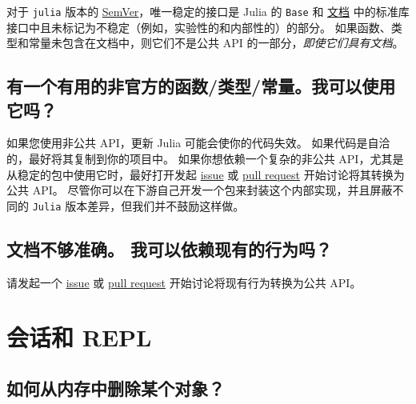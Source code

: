 对于 \texttt{julia} 版本的 \href{https://semver.org/}{SemVer}，唯一稳定的接口是 Julia 的 \texttt{Base} 和 \href{https://docs.julialang.org/}{文档} 中的标准库接口中且未标记为不稳定（例如，实验性的和内部性的）的部分。 如果函数、类型和常量未包含在文档中，则它们不是公共 API 的一部分，\emph{即使它们具有文档}。



\hypertarget{9375534551924275108}{}


\subsection{有一个有用的非官方的函数/类型/常量。我可以使用它吗？}



如果您使用非公共 API，更新 Julia 可能会使你的代码失效。 如果代码是自洽的，最好将其复制到你的项目中。 如果你想依赖一个复杂的非公共 API，尤其是从稳定的包中使用它时，最好打开发起 \href{https://github.com/JuliaLang/julia/issues}{issue} 或 \href{https://github.com/JuliaLang/julia/pulls}{pull request} 开始讨论将其转换为公共 API。 尽管你可以在下游自己开发一个包来封装这个内部实现，并且屏蔽不同的 \texttt{Julia} 版本差异，但我们并不鼓励这样做。



\hypertarget{17418216214092674945}{}


\subsection{文档不够准确。 我可以依赖现有的行为吗？}



请发起一个 \href{https://github.com/JuliaLang/julia/issues}{issue} 或 \href{https://github.com/JuliaLang/julia/pulls}{pull request} 开始讨论将现有行为转换为公共 API。



\hypertarget{4239210502811614787}{}


\section{会话和 REPL}



\hypertarget{503979811911045199}{}


\subsection{如何从内存中删除某个对象？}



